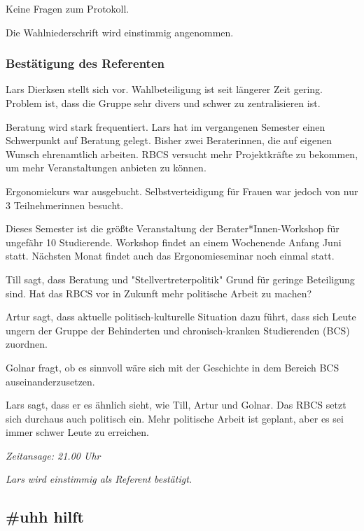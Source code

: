 \documentclass[ngerman,headheight=70pt]{scrartcl}
\begin{document}
    Keine Fragen zum Protokoll.

    Die Wahlniederschrift wird einstimmig angenommen.

    \subsubsection{Bestätigung des Referenten}

    Lars Dierksen stellt sich vor. Wahlbeteiligung ist seit längerer Zeit gering.
    Problem ist, dass die Gruppe sehr divers und schwer zu zentralisieren
    ist.

    Beratung wird stark frequentiert. Lars hat im vergangenen Semester
    einen Schwerpunkt auf Beratung gelegt. Bisher zwei Beraterinnen,
    die auf eigenen Wunsch ehrenamtlich arbeiten. RBCS versucht mehr
    Projektkräfte zu bekommen, um mehr Veranstaltungen anbieten zu können.

    Ergonomiekurs war ausgebucht. Selbstverteidigung für Frauen war jedoch
    von nur 3 Teilnehmerinnen besucht.

    Dieses Semester ist die größte Veranstaltung der Berater*Innen-Workshop
    für ungefähr 10 Studierende. Workshop findet an einem Wochenende
    Anfang Juni statt. Nächsten Monat findet auch das Ergonomieseminar noch einmal
    statt.

    Till sagt, dass Beratung und "Stellvertreterpolitik" Grund für geringe
    Beteiligung sind. Hat das RBCS vor in Zukunft mehr politische Arbeit
    zu machen?

    Artur sagt, dass aktuelle politisch-kulturelle Situation dazu führt, dass
    sich Leute ungern der Gruppe der Behinderten und chronisch-kranken
    Studierenden (BCS) zuordnen.

    Golnar fragt, ob es sinnvoll wäre sich mit der Geschichte in dem Bereich
    BCS auseinanderzusetzen.

    Lars sagt, dass er es ähnlich sieht, wie Till, Artur und Golnar. Das RBCS
    setzt sich durchaus auch politisch ein. Mehr politische Arbeit ist
    geplant, aber es sei immer schwer Leute zu erreichen.

    \textit{Zeitansage: 21.00 Uhr}

    \textit{Lars wird einstimmig als Referent bestätigt.}

    \subsection{\#uhh hilft}
\end{document}
